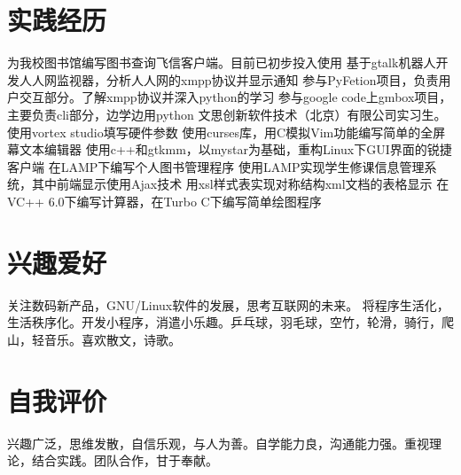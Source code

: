 \documentclass[a4paper]{moderncvwutao}
\begin{document}
\begin{CJK*}{UTF8}{gbsn}
\section{实践经历}
{为我校图书馆编写图书查询飞信客户端。目前已初步投入使用}
{基于gtalk机器人开发人人网监视器，分析人人网的xmpp协议并显示通知}
{ 参与PyFetion项目，负责用户交互部分。了解xmpp协议并深入python的学习}
{	参与google code上gmbox项目，主要负责cli部分，边学边用python }
{ 文思创新软件技术（北京）有限公司实习生。使用vortex studio填写硬件参数 }
{ 使用curses库，用C模拟Vim功能编写简单的全屏幕文本编辑器 }
{ 使用c++和gtkmm，以mystar为基础，重构Linux下GUI界面的锐捷客户端 }
{ 在LAMP下编写个人图书管理程序 }
{ 使用LAMP实现学生修课信息管理系统，其中前端显示使用Ajax技术 }
{ 用xsl样式表实现对称结构xml文档的表格显示 }
{ 在VC++ 6.0下编写计算器，在Turbo C下编写简单绘图程序 }
\section{兴趣爱好}
\cvitem{}
{
\small 关注数码新产品，GNU/Linux软件的发展，思考互联网的未来。 将程序生活化，生活秩序化。开发小程序，消遣小乐趣。乒乓球，羽毛球，空竹，轮滑，骑行，爬山，轻音乐。喜欢散文，诗歌。
}
\section{自我评价}
\cvitem{}{}
{
兴趣广泛，思维发散，自信乐观，与人为善。自学能力良，沟通能力强。重视理论，结合实践。团队合作，甘于奉献。
}
\closesection
\end{CJK*}
\end{document}
